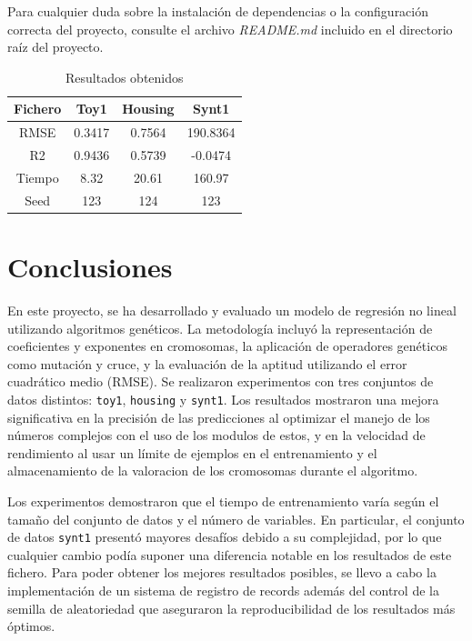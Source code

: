 \documentclass[conference,a4paper]{IEEEtran}
\begin{document}
Para cualquier duda sobre la instalación de dependencias o la configuración correcta del proyecto, consulte el archivo \textit{README.md} incluido en el directorio raíz del proyecto.


\begin{table} [h]
  \caption{Resultados obtenidos}
  \label{tab:resultados}
  \centering
  \begin{tabular}{cccc}
    \toprule
     Fichero & Toy1 & Housing & Synt1 \\
    \midrule
    RMSE & 0.3417 & 0.7564 & 190.8364 \\
    R2 & 0.9436 & 0.5739 & -0.0474 \\
    \midrule
    Tiempo & 8.32 & 20.61 & 160.97 \\
    Seed & 123 & 124 & 123 \\
    \bottomrule
  \end{tabular}
\end{table}


\section{Conclusiones}

En este proyecto, se ha desarrollado y evaluado un modelo de regresión no lineal utilizando algoritmos genéticos. La metodología incluyó la representación de coeficientes y exponentes en cromosomas, la aplicación de operadores genéticos como mutación y cruce, y la evaluación de la aptitud utilizando el error cuadrático medio (RMSE). Se realizaron experimentos con tres conjuntos de datos distintos: \texttt{toy1}, \texttt{housing} y \texttt{synt1}. Los resultados mostraron una mejora significativa en la precisión de las predicciones al optimizar el manejo de los números complejos con el uso de los modulos de estos, y en la velocidad de rendimiento al usar un límite de ejemplos en el entrenamiento y el almacenamiento de la valoracion de los cromosomas durante el algoritmo.

Los experimentos demostraron que el tiempo de entrenamiento varía según el tamaño del conjunto de datos y el número de variables. En particular, el conjunto de datos \texttt{synt1} presentó mayores desafíos debido a su complejidad, por lo que cualquier cambio podía suponer una diferencia notable en los resultados de este fichero. Para poder obtener los mejores resultados posibles, se llevo a cabo la implementación de un sistema de registro de records además del control de la semilla de aleatoriedad que aseguraron la reproducibilidad de los resultados más óptimos.
\end{document}
